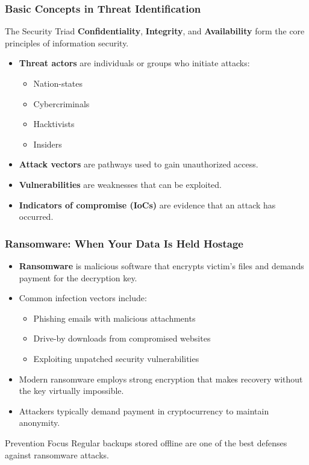 \documentclass{beamer}
\begin{document}
\begin{frame}
    \frametitle{Basic Concepts in Threat Identification}
    
    \begin{block}{The Security Triad}
        \textbf{Confidentiality}, \textbf{Integrity}, and \textbf{Availability} form the core principles of information security.
    \end{block}
    
    \begin{itemize}
        \item \textbf{Threat actors} are individuals or groups who initiate attacks:
            \begin{itemize}
                \item Nation-states
                \item Cybercriminals
                \item Hacktivists
                \item Insiders
            \end{itemize}
        \item \textbf{Attack vectors} are pathways used to gain unauthorized access.
        \item \textbf{Vulnerabilities} are weaknesses that can be exploited.
        \item \textbf{Indicators of compromise (IoCs)} are evidence that an attack has occurred.
    \end{itemize}
\end{frame}
\begin{frame}
    \frametitle{Ransomware: When Your Data Is Held Hostage}
    
    \begin{itemize}
        \item \textbf{Ransomware} is malicious software that encrypts victim's files and demands payment for the decryption key.
        \item Common infection vectors include:
            \begin{itemize}
                \item Phishing emails with malicious attachments
                \item Drive-by downloads from compromised websites
                \item Exploiting unpatched security vulnerabilities
            \end{itemize}
        \item Modern ransomware employs strong encryption that makes recovery without the key virtually impossible.
        \item Attackers typically demand payment in cryptocurrency to maintain anonymity.
    \end{itemize}
    
    \begin{alertblock}{Prevention Focus}
        Regular backups stored offline are one of the best defenses against ransomware attacks.
    \end{alertblock}
\end{frame}
\end{document}
